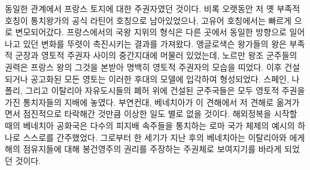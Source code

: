 동일한 관계에서 프랑스 토지에 대한 주권자였던 것이다.
비록 오랫동안 저 옛 부족적 호칭이 통치왕가의 공식 라틴어 호칭으로 남아있었으나,
고유어 호칭에서는 빠르게 으로 변모되어갔다.
프랑스에서의 국왕 지위의 형식은 다른 곳에서 동일한 방향으로 일어나고 있던
변화를 뚜렷이 촉진시키는 결과를 가져왔다.
앵글로색슨 왕가들의 왕은 부족적 군장과 영토적 주권자 사이의
중간지대에 머물러 있었는데,
노르만 왕조 군주들의 권력은 프랑스 왕의 그것을 본받아 명백히
영토적 주권자의 모습을 띠었다.
이후 건설되거나 공고화된 모든 영토는 이러한 후대의 모델에 입각하여 형성되었다.
스페인, 나폴리, 그리고 이탈리아 자유도시들의 폐허 위에 건설된
군주국들은 모두 영토적 주권을 가진 통치자들의 지배에 놓였다.
부연컨대, 베네치아가 이 견해에서 저 견해로 옮겨가면서 점진적으로
타락해간 것만큼 이상한 일도 별로 없을 것이다.
해외정복을 시작할 때의 베네치아 공화국은
다수의 피지배 속주들을 통치하는
로마 국가 체제의 예시의 하나로
스스로를
간주했었다.
그로부터 한 세기가 지난 후의 베네치아는
이탈리아와 에게해의 점유지들에 대해
봉건영주의 권리를 주장하는 주권체로 보여지기를
바라게 되었던 것이다.

